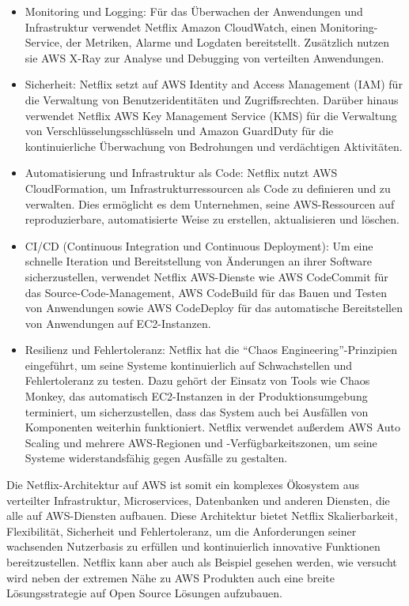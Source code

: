 \documentclass[../vs-script-first-v01.tex]{subfiles}
\begin{document}
\begin{itemize}
\item Monitoring und Logging: Für das Überwachen der Anwendungen und Infrastruktur verwendet Netflix Amazon CloudWatch, einen Monitoring-Service, der Metriken, Alarme und Logdaten bereitstellt. Zusätzlich nutzen sie AWS X-Ray zur Analyse und Debugging von verteilten Anwendungen.
\item Sicherheit: Netflix setzt auf AWS Identity and Access Management (IAM) für die Verwaltung von Benutzeridentitäten und Zugriffsrechten. Darüber hinaus verwendet Netflix AWS Key Management Service (KMS) für die Verwaltung von Verschlüsselungsschlüsseln und Amazon GuardDuty für die kontinuierliche Überwachung von Bedrohungen und verdächtigen Aktivitäten.
\item Automatisierung und Infrastruktur als Code: Netflix nutzt AWS CloudFormation, um Infrastrukturressourcen als Code zu definieren und zu verwalten. Dies ermöglicht es dem Unternehmen, seine AWS-Ressourcen auf reproduzierbare, automatisierte Weise zu erstellen, aktualisieren und löschen.
\item CI/CD (Continuous Integration und Continuous Deployment): Um eine schnelle Iteration und Bereitstellung von Änderungen an ihrer Software sicherzustellen, verwendet Netflix AWS-Dienste wie AWS CodeCommit für das Source-Code-Management, AWS CodeBuild für das Bauen und Testen von Anwendungen sowie AWS CodeDeploy für das automatische Bereitstellen von Anwendungen auf EC2-Instanzen.
\item Resilienz und Fehlertoleranz: Netflix hat die \enquote{Chaos Engineering}-Prinzipien eingeführt, um seine Systeme kontinuierlich auf Schwachstellen und Fehlertoleranz zu testen. Dazu gehört der Einsatz von Tools wie Chaos Monkey, das automatisch EC2-Instanzen in der Produktionsumgebung terminiert, um sicherzustellen, dass das System auch bei Ausfällen von Komponenten weiterhin funktioniert. Netflix verwendet außerdem AWS Auto Scaling und mehrere AWS-Regionen und -Verfügbarkeitszonen, um seine Systeme widerstandsfähig gegen Ausfälle zu gestalten.
\end{itemize}
Die Netflix-Architektur auf AWS ist somit ein komplexes Ökosystem aus verteilter Infrastruktur, Microservices, Datenbanken und anderen Diensten, die alle auf AWS-Diensten aufbauen. Diese Architektur bietet Netflix Skalierbarkeit, Flexibilität, Sicherheit und Fehlertoleranz, um die Anforderungen seiner wachsenden Nutzerbasis zu erfüllen und kontinuierlich innovative Funktionen bereitzustellen.
Netflix kann aber auch als Beispiel gesehen werden, wie versucht wird neben der extremen Nähe zu AWS Produkten auch eine breite Lösungsstrategie auf Open Source Lösungen aufzubauen. 
\end{document}
